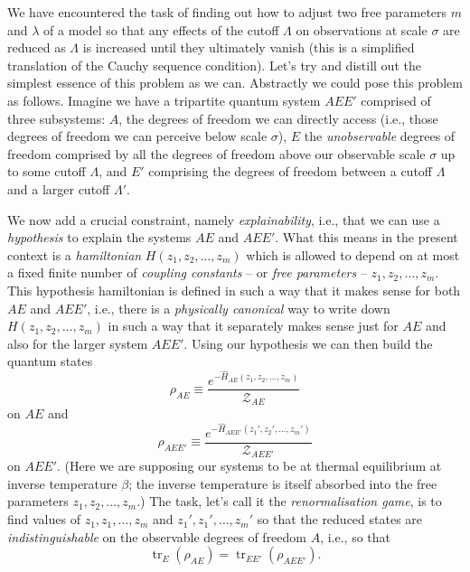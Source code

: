 \documentclass[11pt]{amsart}
\DeclareMathOperator{\tr}{tr}
\theoremstyle{plain}%
\theoremstyle{definition}
\theoremstyle{remark}
\begin{document}
We have encountered the task of finding out how to adjust two free parameters $m$ and $\lambda$ of a model so that any effects of the cutoff $\Lambda$ on observations at scale $\sigma$ are reduced as $\Lambda$ is increased until they ultimately vanish (this is a simplified translation of the Cauchy sequence condition). Let's try and distill out the simplest essence of this problem as we can. Abstractly we could pose this problem as follows. Imagine we have a tripartite quantum system $AEE'$ comprised of three subsystems: $A$, the degrees of freedom we can directly access (i.e., those degrees of freedom we can perceive below scale $\sigma$), $E$ the \emph{unobservable} degrees of freedom comprised by all the degrees of freedom above our observable scale $\sigma$ up to some cutoff $\Lambda$, and $E'$ comprising the degrees of freedom between a cutoff $\Lambda$ and a larger cutoff $\Lambda'$. 

We now add a crucial constraint, namely \emph{explainability}, i.e., that we can use a \emph{hypothesis} to explain the systems $AE$ and $AEE'$. What this means in the present context is a \emph{hamiltonian} $H(z_1, z_2, \ldots, z_m)$ which is allowed to depend on at most a fixed finite number of \emph{coupling constants} -- or \emph{free parameters} -- $z_1, z_2, \ldots, z_m$. This hypothesis hamiltonian is defined in such a way that it makes sense for both $AE$ and $AEE'$, i.e., there is a \emph{physically canonical} way to write down $H(z_1, z_2, \ldots, z_m)$ in such a way that it separately makes sense just for $AE$ and also for the larger system $AEE'$. Using our hypothesis we can then build the quantum states 
\begin{equation}
	\rho_{AE} \equiv \frac{e^{-\widehat{H}_{AE}(z_1, z_2, \ldots, z_m)} }{\mathcal{Z}_{AE}}
\end{equation} 
on $AE$ and 
\begin{equation}
	\rho_{AEE'} \equiv \frac{e^{-\widehat{H}_{AEE'}(z_1', z_2', \ldots, z_m')} }{\mathcal{Z}_{AEE'}}
\end{equation} 
on $AEE'$. (Here we are supposing our systems to be at thermal equilibrium at inverse temperature $\beta$; the inverse temperature is itself absorbed into the free parameters $z_1,z_2, \ldots, z_m$.) The task, let's call it the \emph{renormalisation game}, is to find values of $z_1, z_1, \ldots, z_m$ and $z_1', z_1', \ldots, z_m'$ so that the reduced states are \emph{indistinguishable} on the observable degrees of freedom $A$, i.e., so that
\begin{equation}
	\tr_{E}(\rho_{AE}) = \tr_{EE'}(\rho_{AEE'}).
\end{equation}
\end{document}
